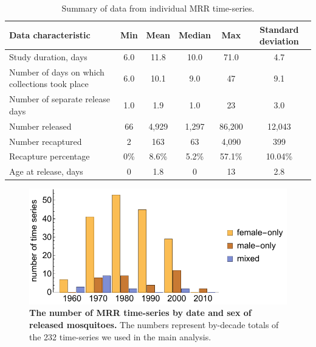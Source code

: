 \documentclass[12pt]{article}
\begin{document}
\begin{table}[htbp]
	\centering
	\footnotesize
	\begin{adjustwidth}{-0.5in}{-0.5in}%
		\begin{tabularx}{1.25\textwidth}{l|ccccc}
			\toprule
			\textbf{Data characteristic} & \textbf{Min} & \textbf{Mean} & \textbf{Median} & \textbf{Max} & \textbf{Standard deviation} \\
			\midrule
			Study duration, days & 6.0   & 11.8  & 10.0  & 71.0    & 4.7 \\
			Number of days on which collections took place & 6.0   & 10.1  & 9.0   & 47    & 9.1 \\
			Number of separate release days & 1.0     & 1.9   & 1.0     & 23    & 3.0 \\
			Number released & 66    & 4,929  & 1,297  & 86,200 & 12,043 \\
			Number recaptured & 2     & 163   & 63    & 4,090  & 399 \\
			Recapture percentage & 0\% & 8.6\% & 5.2\% & 57.1\% & 10.04\% \\
			Age at release, days & 0   & 1.8   & 0   & 13    & 2.8 \\
			\bottomrule
		\end{tabularx}%
		\caption{Summary of data from individual MRR time-series.}
		\label{tab:mrr_IndividualData}%
	\end{adjustwidth}
\end{table}%

\begin{figure}[h]
	\centerline{\includegraphics[width=1\textwidth]{./Figure_files/mrr_sexReleasesOverTime.pdf}}
	\caption{\textbf{The number of MRR time-series by date and sex of released mosquitoes.} The numbers represent by-decade totals of the 232 time-series we used in the main analysis.}
	\label{fig:mrr_sexReleasesOverTime}
\end{figure}
\end{document}
